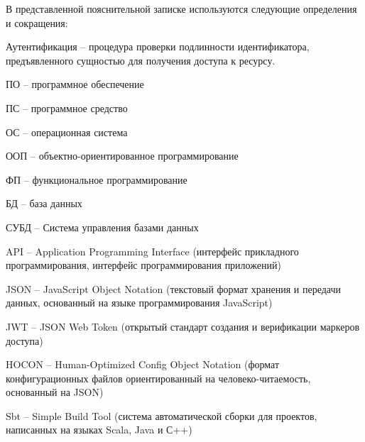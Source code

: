 
В представленной пояснительной записке используются следующие определения и сокращения:

Аутентификация -- процедура проверки подлинности идентификатора, предъявленного сущностью для получения доступа к ресурсу.

ПО -- программное обеспечение

ПС – программное средство

ОС -- операционная система

ООП -- объектно-ориентированное программирование

ФП -- функциональное программирование

БД -- база данных

СУБД -- Система управления базами данных

API -- Application Programming Interface (интерфейс прикладного программирования, интерфейс программирования приложений)

JSON -- JavaScript Object Notation (текстовый формат хранения и передачи данных, основанный на языке программирования JavaScript)

JWT -- JSON Web Token (открытый стандарт создания и верификации маркеров доступа)

HOCON -- Human-Optimized Config Object Notation (формат конфигурационных файлов ориентированный на человеко-читаемость, основанный на JSON)

Sbt -- Simple Build Tool (система автоматической сборки для проектов, написанных на языках Scala, Java и С++)

\clearpage
